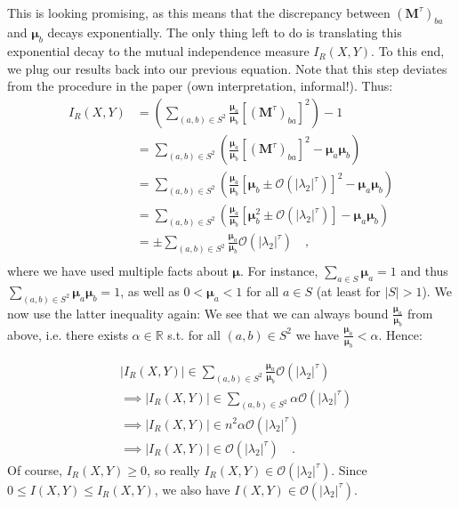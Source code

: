 \documentclass[../../main.tex]{subfiles}
\begin{document}
    ~\\
    This is looking promising, as this means that the discrepancy between $(\boldsymbol{M}^\tau)_{ba}$ and $\boldsymbol{\mu}_b$ decays exponentially. The only thing left to do is translating this exponential decay to the mutual independence measure $I_R(X, Y)$. To this end, we plug our results back into our previous equation. Note that this step deviates from the procedure in the paper (own interpretation, informal!). Thus:
    \begin{align*}
        I_R(X, Y) &= \left( \sum_{(a,b) \in S^2} \frac{\boldsymbol{\mu}_a}{\boldsymbol{\mu}_b} \left[ (\boldsymbol{M}^{\tau})_{ba} \right] ^2 \right) - 1 \\
        &= \sum_{(a,b) \in S^2} \left( \frac{\boldsymbol{\mu}_a}{\boldsymbol{\mu}_b} \left[ (\boldsymbol{M}^{\tau})_{ba} \right] ^2 - \boldsymbol{\mu}_a \boldsymbol{\mu}_b \right) \\
        &= \sum_{(a,b) \in S^2} \left( \frac{\boldsymbol{\mu}_a}{\boldsymbol{\mu}_b} \left[ \boldsymbol{\mu}_b \pm \mathcal{O}(|\lambda_2|^\tau) \right] ^2 - \boldsymbol{\mu}_a \boldsymbol{\mu}_b \right) \\
        &= \sum_{(a,b) \in S^2} \left( \frac{\boldsymbol{\mu}_a}{\boldsymbol{\mu}_b} \left[ \boldsymbol{\mu}_b^2 \pm \mathcal{O}(|\lambda_2|^\tau) \right] - \boldsymbol{\mu}_a \boldsymbol{\mu}_b \right) \\
        &= \pm \sum_{(a,b) \in S^2} \frac{\boldsymbol{\mu}_a}{\boldsymbol{\mu}_b} \mathcal{O}(|\lambda_2|^\tau) \quad , \\
    \end{align*}
    where we have used multiple facts about $\boldsymbol{\mu}$. For instance, $\sum_{a \in S} \boldsymbol{\mu}_a = 1$ and thus $\sum_{(a,b) \in S^2} \boldsymbol{\mu}_a \boldsymbol{\mu}_b = 1$, as well as $0 < \boldsymbol{\mu}_a < 1$ for all $a \in S$ (at least for $|S| > 1$). We now use the latter inequality again: We see that we can always bound $\frac{\boldsymbol{\mu}_a}{\boldsymbol{\mu}_b}$ from above, i.e. there exists $\alpha \in \mathbb{R}$ s.t. for all $(a,b) \in S^2$ we have $\frac{\boldsymbol{\mu}_a}{\boldsymbol{\mu}_b} < \alpha$. Hence:

    \begin{align*}
        &|I_R(X, Y)| \in \sum_{(a,b) \in S^2} \frac{\boldsymbol{\mu}_a}{\boldsymbol{\mu}_b} \mathcal{O}(|\lambda_2|^\tau) \\
        &\implies |I_R(X, Y)| \in \sum_{(a,b) \in S^2} \alpha \mathcal{O}(|\lambda_2|^\tau) \\
        &\implies |I_R(X, Y)| \in n^2 \alpha \mathcal{O}(|\lambda_2|^\tau) \\
        &\implies |I_R(X, Y)| \in \mathcal{O}(|\lambda_2|^\tau) \quad .
    \end{align*}
    Of course, $I_R(X, Y) \geq 0$, so really $I_R(X, Y) \in \mathcal{O}(|\lambda_2|^\tau)$. Since $0 \leq I(X, Y) \leq I_R(X, Y)$, we also have $I(X, Y) \in \mathcal{O}(|\lambda_2|^\tau)$.
\end{document}
